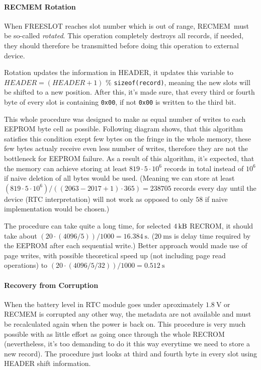 \documentclass[22pt,oneside,a4paper]{article}
\begin{document}
\paragraph{RECMEM Rotation}

When FREESLOT reaches slot number which is out of range, RECMEM must be so-called \textit{rotated}. This operation completely destroys all records, if needed, they should therefore be transmitted before doing this operation to external device.

Rotation updates the information in HEADER, it updates this variable to $HEADER=(HEADER+1)$ \% \Verb!sizeof(record)!, meaning the new slots will be shifted to a new position. After this, it's made sure, that every third or fourth byte of every slot is containing \verb|0x00|, if not \verb|0x00| is written to the third bit.

This whole procedure was designed to make as equal number of writes to each EEPROM byte cell as possible. Following diagram shows, that this algorithm satisfies this condition exept few bytes on the fringe in the whole memory, these few bytes actualy receive even less number of writes, therefore they are not the bottleneck for EEPROM failure. As a result of this algorithm, it's expected, that the memory can achieve storing at least $819\cdot 5\cdot 10^6$ records in total instead of $10^6$ if naive deletion of all bytes would be used. (Meaning we can store at least $(819\cdot 5\cdot 10^6)/((2063 - 2017 +1)\cdot 365)=238705$ records every day until the device (RTC interpretation) will not work as opposed to only $58$ if naive implementation would be chosen.)

The procedure can take quite a long time, for selected $\SI{4}{\kilo\byte}$ RECROM, it should take about $(20\cdot(4096/5))/1000 = \SI{16.384}{\second}$. ($\SI{20}{\milli\second}$ is delay time required by the EEPROM after each sequential write.) Better approach would made use of page writes, with possible theoretical speed up (not including page read operations) to $(20\cdot(4096/5/32))/1000 = \SI{0.512}{\second}$


\paragraph{Recovery from Corruption}

When the battery level in RTC module goes under aproximately $\SI{1.8}{\volt}$ or RECMEM is corrupted any other way, the metadata are not available and must be recalculated again when the power is back on. This procedure is very much possible with as little effort as going once through the whole RECROM (nevertheless, it's too demanding to do it this way everytime we need to store a new record). The procedure just looks at third and fourth byte in every slot using HEADER shift information.
\end{document}
